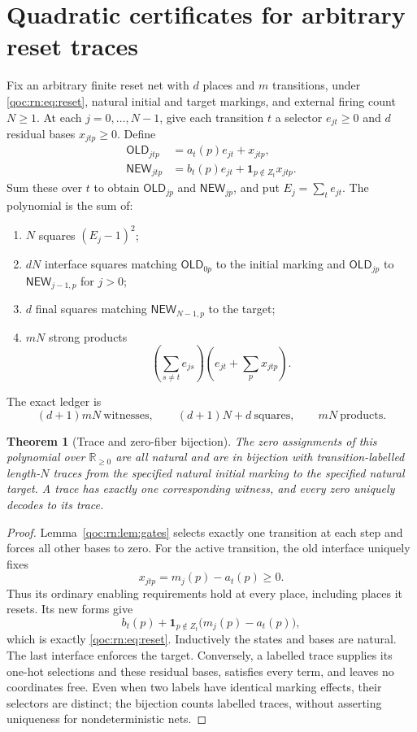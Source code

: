 \documentclass[11pt,letterpaper]{article}
\newtheorem{theorem}{Theorem}[section]
\theoremstyle{definition}
\theoremstyle{remark}
\newcommand{\Rp}{\mathbb R_{\geq0}}
\newcommand{\OLD}{\mathsf{OLD}}
\newcommand{\NEW}{\mathsf{NEW}}
\newcommand{\rnind}{\mathbf 1}
\begin{document}
\section{Quadratic certificates for arbitrary reset traces}
\label{qoc:rn:sec:trace}
Fix an arbitrary finite reset net with $d$ places and $m$ transitions, under \eqref{qoc:rn:eq:reset}, natural initial and target markings, and external firing count $N\geq1$. At each $j=0,\ldots,N-1$, give each transition $t$ a selector $e_{jt}\geq0$ and $d$ residual bases $x_{jtp}\geq0$. Define
\begin{align}
 \OLD_{jtp}&=a_t(p)e_{jt}+x_{jtp},\label{qoc:rn:eq:traceold}\\
 \NEW_{jtp}&=b_t(p)e_{jt}+\rnind_{p\notin Z_t}x_{jtp}.
 \label{qoc:rn:eq:tracenew}
\end{align}
Sum these over $t$ to obtain $\OLD_{jp}$ and $\NEW_{jp}$, and put $E_j=\sum_t e_{jt}$. The polynomial is the sum of:
\begin{enumerate}
\item $N$ squares $(E_j-1)^2$;
\item $dN$ interface squares matching $\OLD_{0p}$ to the initial marking and $\OLD_{jp}$ to $\NEW_{j-1,p}$ for $j>0$;
\item $d$ final squares matching $\NEW_{N-1,p}$ to the target;
\item $mN$ strong products
\[
 \left(\sum_{s\ne t}e_{js}\right)
 \left(e_{jt}+\sum_p x_{jtp}\right).
\]
\end{enumerate}
The exact ledger is
\begin{equation}
 (d+1)mN\ \text{witnesses},\qquad (d+1)N+d\ \text{squares},\qquad mN\ \text{products}.
 \label{qoc:rn:eq:generic-ledger}
\end{equation}

\begin{theorem}[Trace and zero-fiber bijection]
\label{qoc:rn:thm:trace}
The zero assignments of this polynomial over $\Rp$ are all natural and are in bijection with transition-labelled length-$N$ traces from the specified natural initial marking to the specified natural target. A trace has exactly one corresponding witness, and every zero uniquely decodes to its trace.
\end{theorem}
\begin{proof}
Lemma~\ref{qoc:rn:lem:gates} selects exactly one transition at each step and forces all other bases to zero. For the active transition, the old interface uniquely fixes
\[
 x_{jtp}=m_j(p)-a_t(p)\geq0.
\]
Thus its ordinary enabling requirements hold at every place, including places it resets. Its new forms give
\[
 b_t(p)+\rnind_{p\notin Z_t}\bigl(m_j(p)-a_t(p)\bigr),
\]
which is exactly \eqref{qoc:rn:eq:reset}. Inductively the states and bases are natural. The last interface enforces the target. Conversely, a labelled trace supplies its one-hot selections and these residual bases, satisfies every term, and leaves no coordinates free. Even when two labels have identical marking effects, their selectors are distinct; the bijection counts labelled traces, without asserting uniqueness for nondeterministic nets.
\end{proof}
\end{document}
